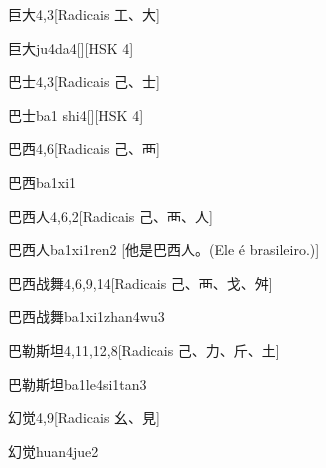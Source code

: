 \begin{entry}{巨大}{4,3}[Radicais ⼯、⼤]
  \begin{phonetics}{巨大}{ju4da4}[][HSK 4]
  \end{phonetics}
\end{entry}

\begin{entry}{巴士}{4,3}[Radicais ⼰、⼠]
  \begin{phonetics}{巴士}{ba1 shi4}[][HSK 4]
  \end{phonetics}
\end{entry}

\begin{entry}{巴西}{4,6}[Radicais ⼰、⾑]
  \begin{phonetics}{巴西}{ba1xi1}
  \end{phonetics}
\end{entry}

\begin{entry}{巴西人}{4,6,2}[Radicais ⼰、⾑、⼈]
  \begin{phonetics}{巴西人}{ba1xi1ren2}
    [他是巴西人。(Ele é brasileiro.)]
  \end{phonetics}
\end{entry}

\begin{entry}{巴西战舞}{4,6,9,14}[Radicais ⼰、⾑、⼽、⾇]
  \begin{phonetics}{巴西战舞}{ba1xi1zhan4wu3}
  \end{phonetics}
\end{entry}

\begin{entry}{巴勒斯坦}{4,11,12,8}[Radicais ⼰、⼒、⽄、⼟]
  \begin{phonetics}{巴勒斯坦}{ba1le4si1tan3}
  \end{phonetics}
\end{entry}

\begin{entry}{幻觉}{4,9}[Radicais ⼳、⾒]
  \begin{phonetics}{幻觉}{huan4jue2}
  \end{phonetics}
\end{entry}

